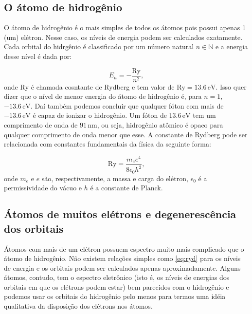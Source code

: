 \documentclass{article}
\begin{document}
\subsection{O \'atomo de hidrog\^enio}\label{sec:hyd}

O \'atomo de hidrog\^enio \'e o mais simples de todos os \'atomos pois possui apenas 1 (um) el\'etron. Nesse caso, os n\'iveis de energia podem ser calculados exatamente. Cada orbital do hidrg\^enio \'e classificado por um n\'umero natural $n\in \mathbb{N}$ e a energia desse n\'ivel \'e dada por:

\begin{equation}\label{eq:ryd}
E_n = -\frac{\text{Ry}}{n^2},
\end{equation}
onde $\text{Ry}$ \'e chamada cosntante de Rydberg e tem valor de $\text{Ry}=13.6\,\text{eV}$. Isso quer dizer que o n\'ivel de menor energia do \'atomo de hidrog\^enio \'e, para $n=1$, $-13.6\,\text{eV}$. Da\'i tamb\'em podemos concluir que qualquer f\'oton com mais de $-13.6\,\text{eV}$ \'e capaz de ionizar o hidrog\^enio. Um f\'oton de $13.6\,\text{eV}$ tem um comprimento de onda de $91\,\text{nm}$, ou seja, hidrog\^enio at\^omico \'e opaco para qualquer comprimento de onda menor que esse. A constante de Rydberg pode ser relacionada com constantes fundamentais da f\'isica da seguinte forma:

\begin{equation}
\text{Ry} = \frac{m_ee^4}{8\epsilon_0h^2},
\end{equation}
onde $m_e$ e $e$ s\~ao, respectivamente, a massa e carga do el\'etron, $\epsilon_0$ \'e a permissividade do v\'acuo e $h$ \'e a constante de Planck.

\subsection{\'Atomos de muitos el\'etrons e degeneresc\^encia dos orbitais}\label{sec:many}

\'Atomos com mais de um el\'etron possuem espectro muito mais complicado que o \'atomo de hidrog\^enio. N\~ao existem rela\c c\~oes simples como \eqref{eq:ryd} para os n\'iveis de energia e os orbitais podem ser calculados apenas aproximadamente. Alguns \'atomos, contudo, tem o espectro eletr\^onico (isto \'e, os n\'iveis de energias dos orbitais em que os el\'etrons podem estar) bem parecidos com o hidrog\^enio e podemos usar os orbitais do hidrog\^enio pelo menos para termos uma id\'eia qualitativa da disposi\c c\~ao dos el\'etrons nos \'atomos.
\end{document}
